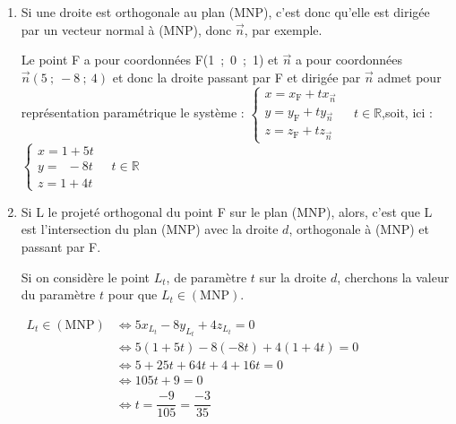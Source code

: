 \documentclass[10pt]{article}
\providecommand{\R}{\mathbb{R}}
\providecommand{\vect}[1]{\overrightarrow{#1}}
\begin{document}
\begin{enumerate}
\begin{enumerate}
C'est donc un vecteur normal de (MNP).

\item On en déduit que le plan (MNP) a une équation cartésienne de la forme $5x - 8y + 4z + d= 0$, où $d$ est un nombre réel.

Comme $\mathrm{M} \in (\mathrm{MNP})$, $d$ est tel que :

$\begin{aligned} 5x_\mathrm{M} - 8y_\mathrm{M} + 4z_\mathrm{M} + d= 0
&\iff 5\times 1 - 8\times 1 + 4\times \dfrac{3}{4} + d =0\\
&\iff 5 - 8 + 3 + d=0\\
&\iff d = 0\\ \end{aligned}$

Une équation cartésienne de (MNP) est donc bien $5x-8y+4z=0$.
	\end{enumerate}
\item Si une droite est orthogonale au plan (MNP), c'est donc qu'elle est dirigée par un vecteur normal à (MNP), donc $\vect{n}$, par exemple.

Le point F a pour coordonnées F(1~;~0~;~1) et $\vect{n}$ a pour coordonnées $\vect{n}(5~;~-8~;~4)$ et donc la droite passant par F et dirigée par $\vect{n}$ admet pour représentation paramétrique le système : $\left\{\begin{array}{l} x=x_{\mathrm{F}} + tx_{\vect{n}}\\
	y=y_{\mathrm{F}} + ty_{\vect{n}}\\
	z=z_{\mathrm{F}} + tz_{\vect{n}} \end{array}\right.\quad t \in \R $,\qquad  soit, ici : $\left\{\begin{array}{l} x=1 + 5t\\
	y=\phantom{1}-8t\\
	z=1+4t \end{array}\right.\quad t \in \R $

\item Si L le projeté orthogonal du point F sur le plan (MNP), alors, c'est que L est l'intersection du plan (MNP) avec la droite $d$, orthogonale à (MNP) et passant par F.

Si on considère le point $L_t$, de paramètre $t$ sur la droite $d$, cherchons la valeur du paramètre $t$ pour que $L_t \in (\mathrm{MNP})$.

$ \begin{aligned} L_t \in (\mathrm{MNP}) &\iff 5x_{L_t} - 8y_{L_t} + 4z_{L_t} = 0\\
		&\iff 5(1 + 5t) - 8(-8t) + 4(1 + 4t) = 0\\
		&\iff 5 + 25t +64t + 4 + 16 t = 0\\
		&\iff 105t + 9 = 0\\
		&\iff t = \dfrac{-9}{105} = \dfrac{-3}{35}	\\ \end{aligned}$


\end{enumerate}
\end{document}
